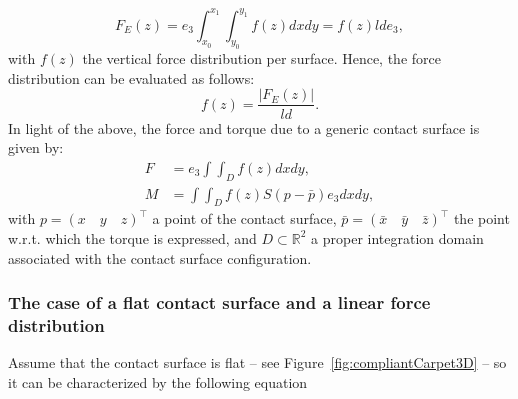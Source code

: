 \documentclass[12pt,a4paper,twoside]{article}
\begin{document}
\begin{equation}
\label{eq:forcesDist3DEst}
F_E(z) = e_3 \int_{x_0}^{x_1} \int_{y_0}^{y_1} f(z) dx dy = f(z) l d e_3,
\end{equation}
with 
$f(z)$  the vertical force distribution per surface. Hence, the force distribution can be evaluated as follows:
\begin{equation}
\label{fromForceToDistr3D}
f(z) = \frac{|F_E(z)|}{ld}.
\end{equation}
In light of the above, the force and torque due to a generic contact surface is given by:
\begin{subequations}
\label{forceTorque3DGeneral}
    \begin{alignat}{2}
\label{eq:forcesDist3DE}
F &= e_3 \int\int_{{D}} f(z) dx dy, \\
\label{eq:torqueDist3DE}
M &= 
\int \int_{{D}}
f(z)S(p-\bar{p})e_3 dx dy, 
    \end{alignat}
\end{subequations}
with $p=(x \quad y \quad z)^\top$ a point of the contact surface,  
$\bar{p} = (\bar{x} \quad \bar{y} \quad \bar{z})^\top$ the point w.r.t. which the torque is expressed, and $D \subset \mathbb{R}^2$ a proper integration domain associated with the contact surface configuration.
\begin{figure}[t]
\end{figure}
%
%        

\subsubsection{The case of a flat contact surface and a linear force distribution}
\label{compliantCarpet3D}
Assume that the contact surface is flat -- see Figure~\ref{fig:compliantCarpet3D} -- so it can be characterized by the following equation
\end{document}
